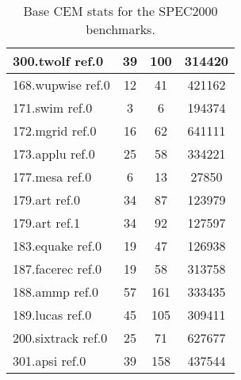 \begin{table}[ht!]
\begin{tabular}{|p{1.3in}|c|c|c|}
\hline
300.twolf ref.0&39&100&314420\\
\hline\hline
168.wupwise ref.0&12&41&421162\\
\hline
171.swim ref.0&3&6&194374\\
\hline
172.mgrid ref.0&16&62&641111\\
\hline
173.applu ref.0&25&58&334221\\
\hline
177.mesa ref.0&6&13&27850\\
\hline
179.art ref.0&34&87&123979\\
\hline
179.art ref.1&34&92&127597\\
\hline
183.equake ref.0&19&47&126938\\
\hline
187.facerec ref.0&19&58&313758\\
\hline
188.ammp ref.0&57&161&333435\\
\hline
189.lucas ref.0&45&105&309411\\
\hline
200.sixtrack ref.0&25&71&627677\\
\hline
301.apsi ref.0&39&158&437544\\
\hline
\end{tabular}
\caption{Base CEM stats for the SPEC2000 benchmarks.}
\label{table:base_stats_2000}
\end{table}

